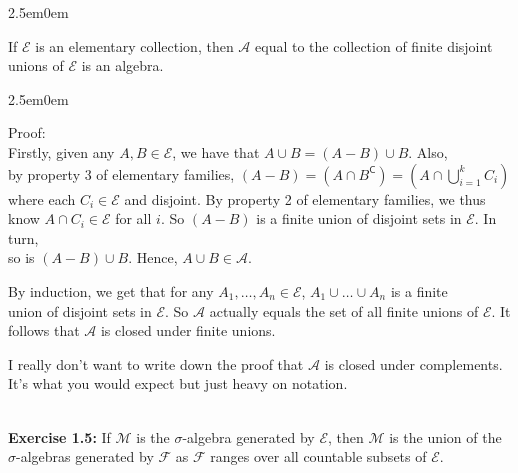 \documentclass{book}
\newcommand{\hTwo}{%
\color{MidnightBlue}%
   \fontsize{13}{15}\selectfont%
}
\newcommand{\hThree}{%
   \color{PineGreen!85!Orange}
   \fontsize{12}{14}\selectfont%
}
\newcommand{\exOne}{%
   \color{Purple}%
   \fontsize{13}{15}\selectfont%
}
\newenvironment{myIndent}{%
   \begin{adjustwidth}{2.5em}{0em}%
}{%
   \end{adjustwidth}%
}
\newcommand{\blab}[1]{\textbf{#1}}
\newcommand{\comp}{\mathsf{C}}
\newcommand{\myHS}{ \hspace{0.5em}}
\newcommand{\mySepTwo}[1][.]{%
   {\noindent\color{#1}{\rule{6.5in}{0.5mm}}}\\%
}
\newcommand{\retTwo}{\hfill\bigbreak}
\begin{document}
\begin{myIndent}\hTwo
   If $\mathcal{E}$ is an elementary collection, then $\mathcal{A}$ equal to the collection of finite disjoint\\ unions of $\mathcal{E}$ is an algebra.\retTwo

   \begin{myIndent}\hThree
      Proof:\\
      Firstly, given any $A, B \in \mathcal{E}$, we have that $A \cup B = (A - B) \cup B$. Also,\\ [-2pt] by property 3 of elementary families, $(A - B) = (A \cap B^\comp) = (A \cap \bigcup\limits_{i=1}^k C_i)$\\ where each $C_i \in \mathcal{E}$ and disjoint. By property 2 of elementary families, we thus\\ [4pt] know $A \cap C_i \in \mathcal{E}$ for all $i$. So $(A - B)$ is a finite union of disjoint sets in $\mathcal{E}$. In turn,\\ [4pt] so is $(A - B) \cup B$. Hence, $A \cup B \in \mathcal{A}$.\retTwo

      By induction, we get that for any $A_1, \ldots, A_n \in \mathcal{E}$,\myHS $A_1 \cup \ldots \cup A_n$ is a finite\\ union of disjoint sets in $\mathcal{E}$. So $\mathcal{A}$ actually equals the set of all finite unions of $\mathcal{E}$. It\\ follows that $\mathcal{A}$ is closed under finite unions.\retTwo

      I really don't want to write down the proof that $\mathcal{A}$ is closed under complements. It's what you would expect but just heavy on notation.
   \end{myIndent}
\end{myIndent}

\exOne\mySepTwo 

\blab{Exercise 1.5:} If $\mathcal{M}$ is the $\sigma$-algebra generated by $\mathcal{E}$, then $\mathcal{M}$ is the union of the $\sigma$-algebras generated by $\mathcal{F}$ as $\mathcal{F}$ ranges over all countable subsets of $\mathcal{E}$.
\end{document}
